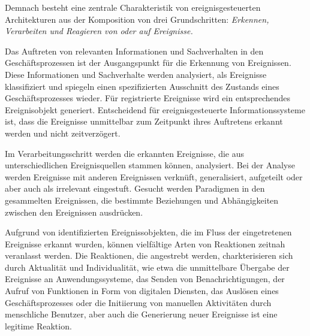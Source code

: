 Demnach besteht eine zentrale Charakteristik von ereignisgesteuerten Architekturen aus der Komposition von drei Grundschritten: \textit{Erkennen, Verarbeiten und Reagieren von oder auf Ereignisse.}

Das Auftreten von relevanten Informationen und Sachverhalten in  den Geschäftsprozessen ist der Ausgangspunkt für die Erkennung von Ereignissen.
Diese Informationen und Sachverhalte werden analysiert, als Ereignisse klassifiziert und spiegeln einen spezifizierten Ausschnitt des Zustands eines Geschäftsprozesses wieder. 
Für registrierte Ereignisse wird ein entsprechendes Ereignisobjekt generiert.
Entscheidend für ereignisgesteuerte Informationssysteme ist, dass die Ereignisse unmittelbar zum Zeitpunkt ihres Auftretens erkannt werden und nicht zeitverzögert.
\cite{Bruns.2010}

Im Verarbeitungsschritt werden die erkannten Ereignisse, die aus unterschiedlichen Ereignisquellen stammen können, analysiert. Bei der Analyse werden Ereignisse mit anderen Ereignissen verknüft, generalisiert, aufgeteilt oder aber auch als irrelevant eingestuft. 
Gesucht werden Paradigmen in den gesammelten Ereignissen, die bestimmte Beziehungen und Abhängigkeiten zwischen den Ereignissen ausdrücken.
\cite{Hedtstuck.2017}

Aufgrund von identifizierten Ereignissobjekten, die im Fluss der eingetretenen Ereignisse erkannt wurden, können vielfältige Arten von Reaktionen zeitnah veranlasst werden.
Die Reaktionen, die angestrebt werden, charkterisieren sich durch Aktualität und Individualität, wie etwa die unmittelbare Übergabe der Ereignisse an Anwendungssysteme, das Senden von Benachrichtigungen, der Aufruf von Funktionen in Form von digitalen Diensten, das Auslösen eines Geschäftsprozesses oder die Initiierung von manuellen Aktivitäten durch menschliche Benutzer, aber auch die Generierung neuer Ereignisse ist eine legitime Reaktion.
\cite{Bruns.2010}

